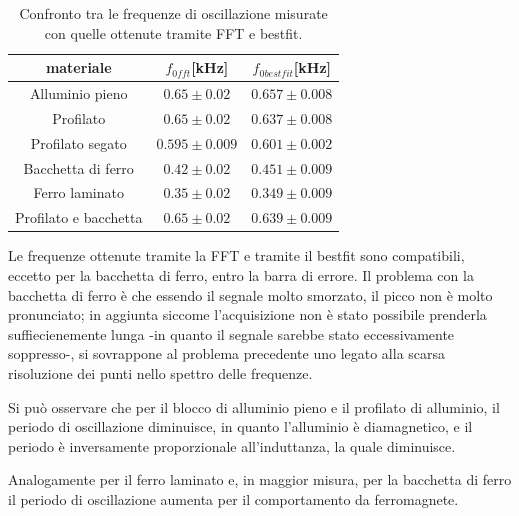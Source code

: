 \documentclass{article}
\begin{document}
        \begin{table}[H]
            \centering
            \caption{Confronto tra le frequenze di oscillazione misurate con quelle ottenute tramite FFT e bestfit.}
                \begin{tabular}{ccc}
                    materiale           &   $f_{0fft}$[kHz]     & $f_{0bestfit}$[kHz] \\
                    \hline
                    Alluminio pieno     & $0.65\pm0.02$         & $0.657\pm0.008$ \\
                    Profilato           & $0.65\pm0.02$         & $0.637\pm0.008$ \\
                    Profilato segato    & $0.595\pm0.009$       & $0.601\pm0.002$ \\
                    Bacchetta di ferro  & $0.42\pm0.02$         & $0.451\pm0.009$ \\
                    Ferro laminato      & $0.35\pm0.02$         & $0.349\pm0.009$ \\
                    Profilato e bacchetta& $0.65\pm0.02$        & $0.639\pm0.009$ \\  
                \end{tabular}
                \label{tab:mat_smor}

        \end{table}

        Le frequenze ottenute tramite la FFT e tramite il bestfit sono compatibili, 
        eccetto per la bacchetta di ferro, entro la barra di errore.
        Il problema con la bacchetta di ferro è che essendo il segnale molto smorzato, 
        il picco non è molto pronunciato; in aggiunta siccome l'acquisizione non è stato
        possibile prenderla suffiecienemente lunga -in quanto il segnale sarebbe stato 
        eccessivamente soppresso-, si sovrappone al problema precedente 
        uno legato alla scarsa risoluzione dei punti nello spettro delle frequenze.

        
        Si può osservare che per il blocco di alluminio pieno e il profilato di alluminio,
        il periodo di oscillazione diminuisce, in quanto l'alluminio è diamagnetico, 
        e il periodo è inversamente proporzionale all'induttanza, la quale diminuisce.
        
        Analogamente per il ferro laminato e, in maggior misura, per la bacchetta di 
        ferro il periodo di oscillazione aumenta per il comportamento da ferromagnete.
        
\end{document}
